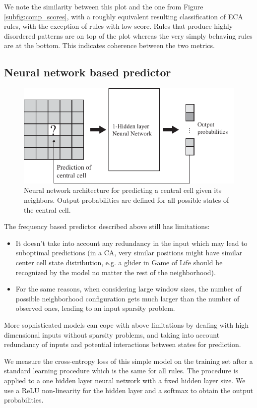 We note the similarity between this plot and the one from Figure
\ref{subfig:comp_scores}, with a roughly equivalent resulting classification of
ECA rules, with the exception of rules with low score. Rules that produce highly
disordered patterns are on top of the plot whereas the very simply behaving
rules are at the bottom. This indicates coherence between the two metrics.

\subsection{Neural network based predictor}

\begin{figure}[htbp]
  \centering
  \includegraphics[width=.7\linewidth]{figures/nn_archi}
  \caption{Neural network architecture for predicting a central cell given its
    neighbors. Output probabilities are defined for all possible states of the
    central cell.}
  \label{fig:nn_archi}
\end{figure}

The frequency based predictor described above still has limitations:
\begin{itemize}
\item It doesn't take into account any redundancy in the input which may lead to
  suboptimal predictions (in a CA, very similar positions might have similar
  center cell state distribution, e.g. a glider in Game of Life should be
  recognized by the model no matter the rest of the neighborhood).
\item For the same reasons, when considering large window sizes, the number of
  possible neighborhood configuration gets much larger than the number of
  observed ones, leading to an input sparsity problem.
\end{itemize}
More sophisticated models can cope with above limitations by dealing with high
dimensional inputs without sparsity problems, and taking into account redundancy
of inputs and potential interactions between states for prediction.

We measure the cross-entropy loss of this simple model on the training set after
a standard learning procedure which is the same for all rules. The procedure is
applied to a one hidden layer neural network with a fixed hidden layer size. We
use a ReLU non-linearity for the hidden layer and a softmax to obtain the output
probabilities.

